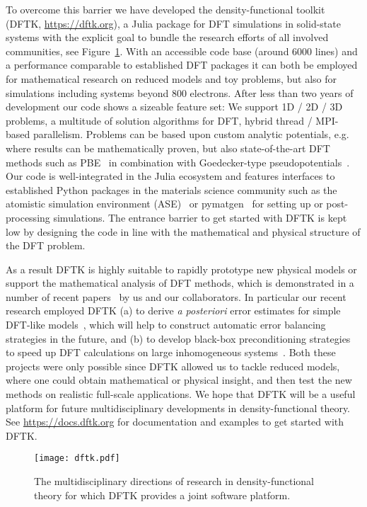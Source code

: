 \documentclass{juliacon}
\begin{document}
To overcome this barrier we have developed
the density-functional toolkit (DFTK, \url{https://dftk.org}),
a Julia package for DFT simulations in solid-state systems
with the explicit goal to bundle the research efforts of all involved communities,
see Figure~\ref{fig:logodftk}.
With an accessible code base (around 6000 lines)
and a performance comparable to established DFT packages
it can both be employed for mathematical research
on reduced models and toy problems,
but also for simulations including systems beyond 800 electrons.
After less than two years of development our code
shows a sizeable feature set:
We support 1D / 2D / 3D problems, a multitude of solution algorithms for DFT,
hybrid thread / MPI-based parallelism.
Problems can be based upon custom analytic potentials,
e.g. where results can be mathematically proven,
but also state-of-the-art DFT methods such as PBE~\cite{Perdew1996} in combination with
Goedecker-type pseudopotentials~\cite{Goedecker1996}.
Our code is well-integrated in the Julia ecosystem
and features interfaces to established Python packages
in the materials science community
such as the atomistic simulation environment (ASE)~\cite{HjorthLarsen2017} or
pymatgen~\cite{Ong2013} for setting up or post-processing simulations.
The entrance barrier to get started with DFTK
is kept low by designing the code in line with the mathematical and physical structure
of the DFT problem.
\vskip 6pt

As a result DFTK is highly suitable to rapidly prototype
new physical models or support the mathematical analysis of DFT methods,
which is demonstrated in a number
of recent papers~\cite{scfanalysis,garrigue2021building,scfprecondition,scferror}
by us and our collaborators.
In particular our recent research employed DFTK
(a) to derive \textit{a posteriori} error estimates for simple DFT-like models~\cite{scferror},
which will help to construct automatic error balancing strategies in the future,
and (b) to develop black-box preconditioning strategies
to speed up DFT calculations on large inhomogeneous systems~\cite{scfprecondition}.
Both these projects were only possible since DFTK allowed us to tackle
reduced models, where one could obtain mathematical or physical insight,
and then test the new methods on realistic full-scale applications.
We hope that DFTK will be a useful platform
for future multidisciplinary developments in density-functional theory.
See \url{https://docs.dftk.org} for documentation and examples to get started with DFTK.
\vskip 6pt

\begin{figure}[t]
    \centerline{\texttt{[image: dftk.pdf]}}
    \caption{The multidisciplinary
        directions of research in density-functional theory
        for which DFTK provides a joint software platform.}
    \label{fig:logodftk}
\end{figure}
\end{document}
